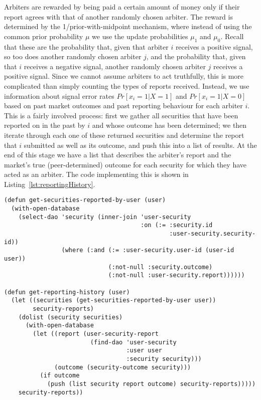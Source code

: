 
Arbiters are rewarded by being paid a certain amount of money only if their
report agrees with that of another randomly chosen arbiter. The reward is
determined by the 1/prior-with-midpoint mechanism, where instead of using the
common prior probability $\mu$ we use the update probabilities $\mu_1$ and
$\mu_0$. Recall that these are the probability that, given that arbiter $i$
receives a positive signal, so too does another randomly chosen arbiter $j$,
and the probability that, given that $i$ receives a negative signal, another
randomly chosen arbiter $j$ receives a positive signal. Since we cannot assume
arbiters to act truthfully, this is more complicated than simply counting the
types of reports received. Instead, we use information about signal error rates
$Pr[x_i=1|X=1]$ and $Pr[x_i=1|X=0]$ based on past market outcomes and past
reporting behaviour for each arbiter $i$. This is a fairly involved process:
first we gather all securities that have been reported on in the past by $i$
and whose outcome has been determined; we then iterate through each one of
these returned securities and determine the report that $i$ submitted as well
as its outcome, and push this into a list of results. At the end of this stage
we have a list  that describes the
arbiter's report and the market's true (peer-determined) outcome for each
security for which they have acted as an arbiter. The code implementing this is
shown in Listing~\ref{lst:reportingHistory}.

\begin{lstlisting}[float,
	label={lst:reportingHistory},
	caption={Gathering a user's reporting history}]
(defun get-securities-reported-by-user (user)
  (with-open-database
    (select-dao 'security (inner-join 'user-security
                                      :on (:= :security.id
                                              :user-security.security-id))
                (where (:and (:= :user-security.user-id (user-id user))
                             (:not-null :security.outcome)
                             (:not-null :user-security.report))))))

(defun get-reporting-history (user)
  (let ((securities (get-securities-reported-by-user user))
        security-reports)
	(dolist (security securities)
	  (with-open-database
	    (let ((report (user-security-report
	                    (find-dao 'user-security
	                              :user user
	                              :security security)))
              (outcome (security-outcome security)))
	      (if outcome
            (push (list security report outcome) security-reports)))))
	security-reports))
\end{lstlisting}

